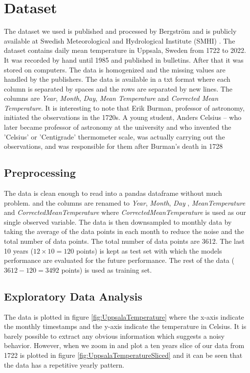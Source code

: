 \documentclass{IEEEtran}
\begin{document}
    \section{Dataset}
    The dataset we used is published and processed by Bergström \cite{BergstromHans2002Data} and is publicly available at Swedish Meteorological and Hydrological Institute (SMHI) \cite{SMHI}. The dataset contains daily mean temperature in Uppsala, Sweden from 1722 to 2022. It was recorded by hand until 1985 and published in bulletins. After that it was stored on computers. The data is homogenized and the missing values are handled by the publishers. The data is available in a txt format where each column is separated by spaces and the rows are separated by new lines. The columns are \textit{Year}, \textit{Month}, \textit{Day}, \textit{Mean Temperature} and \textit{Corrected Mean Temperature}. It is interesting to note that Erik Burman, professor of astronomy, initiated the observations in the 1720s. A young student, Anders Celsius – who later became professor of astronomy at the university and who invented the 'Celsius' or 'Centigrade' thermometer scale, was actually carrying out the observations, and was responsible for them after Burman’s death in 1728 \cite{BergstromHans2002Data}
    \subsection{Preprocessing}
    The data is clean enough to read into a pandas dataframe without much problem. and the columns are renamed to \textit{Year}, \textit{Month}, \textit{Day} , \textit{MeanTemperature} and \textit{CorrectedMeanTemperature} where \textit{CorrectedMeanTemperature} is used as our single observed variable. The data is then downsampled to monthly data by taking the average of the data points in each month to reduce the noise and the total number of data points. The total number of data points are 3612. The last 10 years ($12\times10=120$ points) is kept as test set with which the models performance are evaluated for the future performance. The rest of the data ($3612-120=3492$ points) is used as training set.

    \subsection{Exploratory Data Analysis}
    The data is plotted in figure \ref{fig:UppsalaTemperature} where the x-axis indicate the monthly timestamps and the y-axis indicate the temperature in Celsius. It is barely possible to extract any obvious information which suggests a noisy behavior. However, when we zoom in and plot a ten years slice of our data from 1722 is plotted in figure \ref{fig:UppsalaTemperatureSliced} and it can be seen that the data has a repetitive yearly pattern. 
\end{document}
